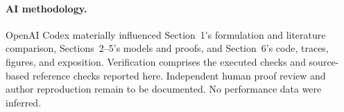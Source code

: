 \documentclass[11pt,letterpaper]{article}
\theoremstyle{definition}
\begin{document}
\paragraph{AI methodology.}
OpenAI Codex materially influenced Section~1's formulation and literature
comparison, Sections~2--5's models and proofs, and Section~6's code, traces,
figures, and exposition. Verification comprises the executed checks and
source-based reference checks reported here. Independent human proof review
and author reproduction remain to be documented. No performance data were
inferred.

\clearpage


\end{document}
